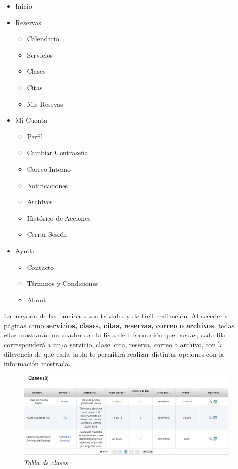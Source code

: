 \begin{itemize}
\item Inicio
\item Reservas

\begin{itemize}
\item Calendario
\item Servicios
\item Clases
\item Citas
\item Mis Resevas
\end{itemize}

\item Mi Cuenta

\begin{itemize}
\item Perfil
\item Cambiar Contraseña
\item Correo Interno
\item Notificaciones
\item Archivos
\item Histórico de Acciones
\item Cerrar Sesión
\end{itemize}

\item Ayuda

\begin{itemize}
\item Contacto
\item Términos y Condiciones
\item About
\end{itemize}

\end{itemize}

La mayoría de las funciones son triviales y de fácil realización. Al acceder a páginas como \textbf{servicios, clases, citas, reservas, correo o archivos}, todas ellas mostrarán un cuadro con la lista de información que buscas, cada fila corresponderá a un/a servicio, clase, cita, reserva, correo o archivo, con la diferencia de que cada tabla te permitirá realizar distintas opciones con la información mostrada. \\

\begin{figure}
\centering
  \includegraphics[scale=.70]{img/manual/tabla-clases.jpg}
  \caption{\textit{Tabla de clases}}
  \label{fig:tabla-clases}
\end{figure}

